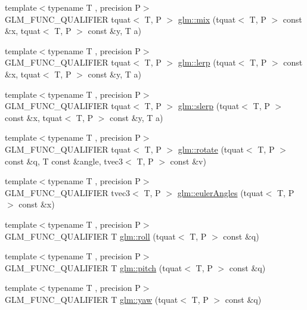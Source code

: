 \begin{DoxyCompactItemize}
\item 
{\footnotesize template$<$typename T , precision P$>$ }\\G\-L\-M\-\_\-\-F\-U\-N\-C\-\_\-\-Q\-U\-A\-L\-I\-F\-I\-E\-R tquat$<$ T, P $>$ \hyperlink{group__gtc__quaternion_ga31cc82178742c36450f5662bd4fb30b0}{glm\-::mix} (tquat$<$ T, P $>$ const \&x, tquat$<$ T, P $>$ const \&y, T a)
\item 
{\footnotesize template$<$typename T , precision P$>$ }\\G\-L\-M\-\_\-\-F\-U\-N\-C\-\_\-\-Q\-U\-A\-L\-I\-F\-I\-E\-R tquat$<$ T, P $>$ \hyperlink{group__gtc__quaternion_ga5692804fa4db9e762a1c19b607e54435}{glm\-::lerp} (tquat$<$ T, P $>$ const \&x, tquat$<$ T, P $>$ const \&y, T a)
\item 
{\footnotesize template$<$typename T , precision P$>$ }\\G\-L\-M\-\_\-\-F\-U\-N\-C\-\_\-\-Q\-U\-A\-L\-I\-F\-I\-E\-R tquat$<$ T, P $>$ \hyperlink{group__gtc__quaternion_ga22b438c7252f3fa5b773c9882471652a}{glm\-::slerp} (tquat$<$ T, P $>$ const \&x, tquat$<$ T, P $>$ const \&y, T a)
\item 
{\footnotesize template$<$typename T , precision P$>$ }\\G\-L\-M\-\_\-\-F\-U\-N\-C\-\_\-\-Q\-U\-A\-L\-I\-F\-I\-E\-R tquat$<$ T, P $>$ \hyperlink{group__gtc__quaternion_gaa8f42979c921e450ff2812fb43c25702}{glm\-::rotate} (tquat$<$ T, P $>$ const \&q, T const \&angle, tvec3$<$ T, P $>$ const \&v)
\item 
{\footnotesize template$<$typename T , precision P$>$ }\\G\-L\-M\-\_\-\-F\-U\-N\-C\-\_\-\-Q\-U\-A\-L\-I\-F\-I\-E\-R tvec3$<$ T, P $>$ \hyperlink{group__gtc__quaternion_gadb92ec1c1b0dd6b024176a73fbef3e64}{glm\-::euler\-Angles} (tquat$<$ T, P $>$ const \&x)
\item 
{\footnotesize template$<$typename T , precision P$>$ }\\G\-L\-M\-\_\-\-F\-U\-N\-C\-\_\-\-Q\-U\-A\-L\-I\-F\-I\-E\-R T \hyperlink{group__gtc__quaternion_ga4fd705376c6c1fd667be0055a0ea58ec}{glm\-::roll} (tquat$<$ T, P $>$ const \&q)
\item 
{\footnotesize template$<$typename T , precision P$>$ }\\G\-L\-M\-\_\-\-F\-U\-N\-C\-\_\-\-Q\-U\-A\-L\-I\-F\-I\-E\-R T \hyperlink{group__gtc__quaternion_ga2c08b93a4261c10748fd4d2104346f17}{glm\-::pitch} (tquat$<$ T, P $>$ const \&q)
\item 
{\footnotesize template$<$typename T , precision P$>$ }\\G\-L\-M\-\_\-\-F\-U\-N\-C\-\_\-\-Q\-U\-A\-L\-I\-F\-I\-E\-R T \hyperlink{group__gtc__quaternion_ga724a5df282b70cec0a6cb0d6dcddb6d6}{glm\-::yaw} (tquat$<$ T, P $>$ const \&q)

\end{DoxyCompactItemize}
